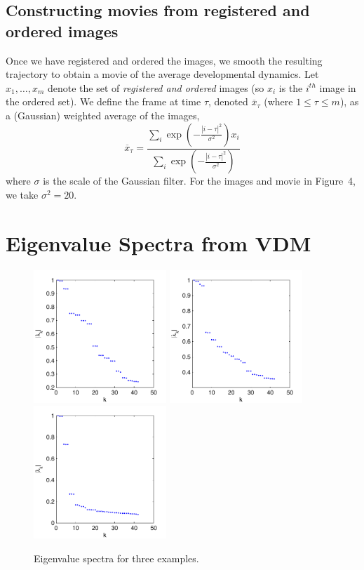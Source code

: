 \documentclass[12pt]{article}
\begin{document}
\subsection{Constructing movies from registered and ordered images}

Once we have registered and ordered the images, we smooth the resulting trajectory to obtain a movie of the average developmental dynamics. 
%
Let $x_1, \dots, x_m$ denote the set of {\em registered and ordered} images (so $x_i$ is the $i^{th}$ image in the ordered set).
%
We define the frame at time $\tau$, denoted $\overline{x}_{\tau}$ (where $1 \le \tau \le m$), as a (Gaussian) weighted average of the images,
\begin{equation}
\overline{x}_{\tau} =  \frac{\sum_i \exp \left( - \frac{|i - \tau|^2}{\sigma^2} \right) x_i}{\sum_i \exp \left( - \frac{|i - \tau|^2}{\sigma^2} \right) }
\end{equation}
where $\sigma$ is the scale of the Gaussian filter. 
%
For the images and movie in Figure~4, we take $\sigma^2 = 20$.
%
 
\section{Eigenvalue Spectra from VDM}


\begin{figure}[H]
\includegraphics[width=5cm]{data1_evals}
\includegraphics[width=5cm]{data2_evals}
\includegraphics[width=5cm]{data3_evals}
\caption{Eigenvalue spectra for three examples.}
\end{figure}
\end{document}
